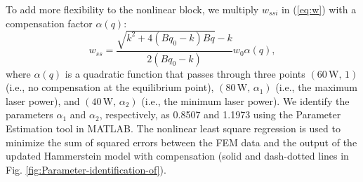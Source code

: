 \documentclass [11pt, proquest] {uwthesis}[2020/02/24]
\begin{document}
To add more flexibility to the nonlinear block, we multiply $w_{ssi}$
in (\ref{eq:w}) with a compensation factor $\alpha(q)$:
\begin{equation}
w_{ss}=\frac{\sqrt{k^{2}+4(Bq_{0}-k)Bq}-k}{2(Bq_{0}-k)}w_{0}\alpha(q),\label{eq:w-1}
\end{equation}
where $\alpha(q)$ is a quadratic function that passes through three
points $(60\,\text{W},\,1)$ (i.e., no compensation at the equilibrium
point), $(80\,\text{W},\,\alpha_{1})$ (i.e., the maximum laser power),
and $(40\,\text{W},\,\alpha_{2})$ (i.e., the minimum laser power).
We identify the parameters $\alpha_{1}$ and $\alpha_{2}$, respectively,
as 0.8507 and 1.1973 using the Parameter Estimation tool in MATLAB.
The nonlinear least square regression is used to minimize the sum
of squared errors between the FEM data and the output of the updated
Hammerstein model with compensation (solid and dash-dotted lines in
Fig. \ref{fig:Parameter-identification-of}).
\end{document}
